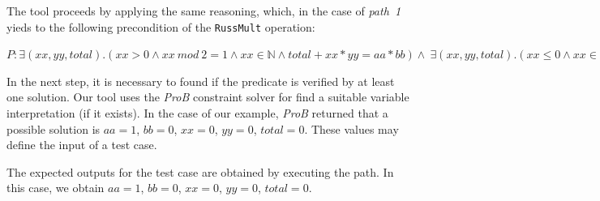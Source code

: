 \documentclass[runningheads]{llncs}
\begin{document}


The tool proceeds by applying the same reasoning, which, in the case of \textit{path~1} yieds to the following precondition of the \texttt{RussMult} operation:


$P: \exists(xx, yy, total).(xx > 0 \wedge xx\ mod\ 2 = 1 \wedge xx \in \mathbb{N} \wedge total + xx * yy = aa * bb) \wedge \ \exists(xx, yy, total).(xx \leq 0 \wedge xx \in \mathbb{N} \wedge total + xx * yy = aa * bb) \wedge xx : \mathbb{N} \wedge yy : \mathbb{N} \wedge total : \mathbb{N} \wedge aa : \mathbb{N} \wedge bb : \mathbb{N}$ 

In the next step, it is necessary to found if the predicate is verified by at least one solution. 
Our tool uses the \textit{ProB} constraint solver for find a suitable variable interpretation (if it exists).
In the case of our example, \textit{ProB} returned that a possible solution is $aa = 1$, $bb = 0$, $xx = 0$, $yy = 0$, $total = 0$. 
These values may define the input of a test case.

The expected outputs for the test case are obtained by executing the path. 
In this case, we obtain $aa = 1$, $bb = 0$, $xx = 0$, $yy = 0$, $total = 0$.

\end{document}
